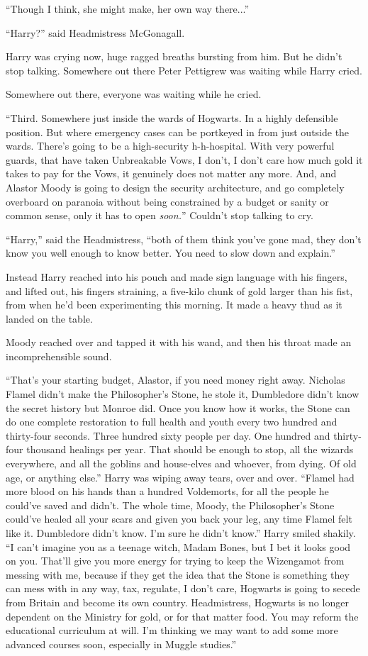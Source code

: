 ``Though I think, she might make, her own way there...''

``Harry?'' said Headmistress McGonagall.

Harry was crying now, huge ragged breaths bursting from him. But he didn't stop talking. Somewhere out there Peter Pettigrew was waiting while Harry cried.

Somewhere out there, everyone was waiting while he cried.

``Third. Somewhere just inside the wards of Hogwarts. In a highly defensible position. But where emergency cases can be portkeyed in from just outside the wards. There's going to be a high-security h-h-hospital. With very powerful guards, that have taken Unbreakable Vows, I don't, I don't care how much gold it takes to pay for the Vows, it genuinely does not matter any more. And, and Alastor Moody is going to design the security architecture, and go completely overboard on paranoia without being constrained by a budget or sanity or common sense, only it has to open \emph{soon.}'' Couldn't stop talking to cry.

``Harry,'' said the Headmistress, ``both of them think you've gone mad, they don't know you well enough to know better. You need to slow down and explain.''

Instead Harry reached into his pouch and made sign language with his fingers, and lifted out, his fingers straining, a five-kilo chunk of gold larger than his fist, from when he'd been experimenting this morning. It made a heavy thud as it landed on the table.

Moody reached over and tapped it with his wand, and then his throat made an incomprehensible sound.

``That's your starting budget, Alastor, if you need money right away. Nicholas Flamel didn't make the Philosopher's Stone, he stole it, Dumbledore didn't know the secret history but Monroe did. Once you know how it works, the Stone can do one complete restoration to full health and youth every two hundred and thirty-four seconds. Three hundred sixty people per day. One hundred and thirty-four thousand healings per year. That should be enough to stop, all the wizards everywhere, and all the goblins and house-elves and whoever, from dying. Of old age, or anything else.'' Harry was wiping away tears, over and over. ``Flamel had more blood on his hands than a hundred Voldemorts, for all the people he could've saved and didn't. The whole time, Moody, the Philosopher's Stone could've healed all your scars and given you back your leg, any time Flamel felt like it. Dumbledore didn't know. I'm sure he didn't know.'' Harry smiled shakily. ``I can't imagine you as a teenage witch, Madam Bones, but I bet it looks good on you. That'll give you more energy for trying to keep the Wizengamot from messing with me, because if they get the idea that the Stone is something they can mess with in any way, tax, regulate, I don't care, Hogwarts is going to secede from Britain and become its own country. Headmistress, Hogwarts is no longer dependent on the Ministry for gold, or for that matter food. You may reform the educational curriculum at will. I'm thinking we may want to add some more advanced courses soon, especially in Muggle studies.''

